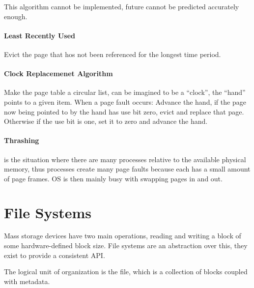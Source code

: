 \documentclass{article}
\begin{document}
\begin{multicols}{1}
This algorithm cannot be implemented, future cannot be predicted accurately enough.

\paragraph{Least Recently Used} Evict the page that hos not been referenced for the longest time period.

\paragraph{Clock Replacemenet Algorithm} Make the page table a circular list, can be imagined to be a \enquote{clock}, the \enquote{hand} points to a given item. When a page fault occurs: Advance the hand, if the page now being pointed to by the hand has use bit zero, evict and replace that page. Otherwise if the use bit is one, set it to zero and advance the hand.

\paragraph{Thrashing} is the situation where there are many processes relative to the available physical memory, thus processes create many page faults because each has a small amount of page frames. OS is then mainly busy with swapping pages in and out.

\section*{File Systems}

Mass storage devices have two main operations, reading and writing a block of some hardware-defined block size. File systems are an abstraction over this, they exist to provide a consistent API.

The logical unit of organization is the file, which is a collection of blocks coupled with metadata.



\end{multicols}
\end{document}
